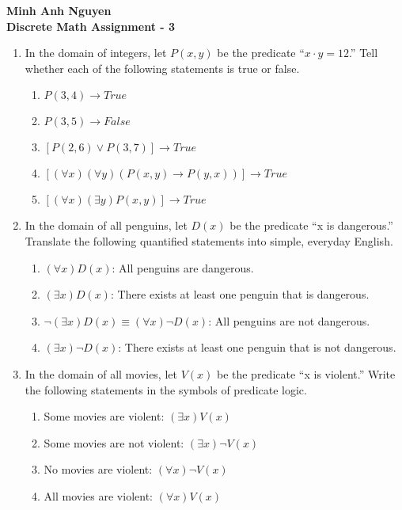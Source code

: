 \documentclass[12pt]{article}
\begin{document}
\textbf{Minh Anh Nguyen }\\
\textbf{Discrete Math \hfill Assignment - 3}

\hrulefill

\begin{enumerate}

      \item In the domain of integers, let $P(x, y)$ be the predicate “$x \cdot y = 12$.” Tell whether each of the following statements is true or false.
            \begin{enumerate}
                  \item $P(3,4) \rightarrow True$
                  \item $P(3,5) \rightarrow False$
                  \item $[P(2,6) \vee P(3,7)] \rightarrow True$
                  \item $[(\forall x)(\forall y)(P(x,y) \rightarrow P(y,x))] \rightarrow True$
                  \item $[(\forall x)(\exists y)P(x,y)] \rightarrow True$
            \end{enumerate}

      \item In the domain of all penguins, let $D(x)$ be the predicate “x is dangerous.” Translate the following quantified statements into simple, everyday English.
            \begin{enumerate}
                  \item $(\forall x)D(x)$: All penguins are dangerous.
                  \item $(\exists x)D(x)$: There exists at least one penguin that is dangerous.
                  \item $\neg (\exists x)D(x) \equiv (\forall x)\neg D(x)$: All penguins are not dangerous.
                  \item $(\exists x)\neg D(x)$: There exists at least one penguin that is not dangerous.
            \end{enumerate}

      \item In the domain of all movies, let $V(x)$ be the predicate “x is violent.” Write the following statements in the symbols of predicate logic.
            \begin{enumerate}
                  \item Some movies are violent: $(\exists x)V(x)$
                  \item Some movies are not violent: $(\exists x) \neg V(x)$
                  \item No movies are violent: $(\forall x) \neg V(x)$
                  \item All movies are violent: $(\forall x) V(x)$
            \end{enumerate}


\end{enumerate}
\end{document}
